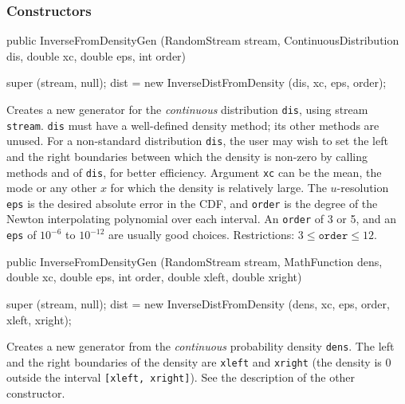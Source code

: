 \subsubsection* {Constructors}
\begin{code}

   public InverseFromDensityGen (RandomStream stream,
                                 ContinuousDistribution dis,
                                 double xc, double eps, int order) \begin{hide} {
      super (stream, null);
      dist = new InverseDistFromDensity (dis, xc, eps, order);
   }\end{hide}
\end{code}
\begin{tabb} Creates a new generator for the \emph{continuous} distribution
\texttt{dis}, using stream \texttt{stream}. \texttt{dis} must have a well-defined
density method; its other methods are unused. For a non-standard distribution
\texttt{dis}, the user may wish to set the left and the right boundaries
between which the density is non-zero by calling methods
and
of \texttt{dis}, for better efficiency.
Argument \texttt{xc} can be the mean,
the mode or any other $x$ for which the density is relatively large.
The $u$-resolution \texttt{eps} is the desired absolute error in the CDF,
and \texttt{order} is the degree of the
Newton interpolating polynomial over each interval.
An \texttt{order} of 3 or 5, and an \texttt{eps} of $10^{-6}$ to $10^{-12}$
are usually good choices.
 Restrictions: $3 \le \texttt{order} \le 12$.
\end{tabb}
\begin{code}

   public InverseFromDensityGen (RandomStream stream, MathFunction dens,
                                 double xc, double eps, int order,
                                 double xleft, double xright) \begin{hide} {
      super (stream, null);
      dist = new InverseDistFromDensity (dens, xc, eps, order, xleft, xright);
   } \end{hide}
\end{code}
\begin{tabb} Creates a new generator from the \emph{continuous} probability density
\texttt{dens}. The left and the right boundaries of the density are
\texttt{xleft} and \texttt{xright} (the density is 0 outside the
interval \texttt{[xleft, xright]}).
See the description of the other constructor.
\end{tabb}


